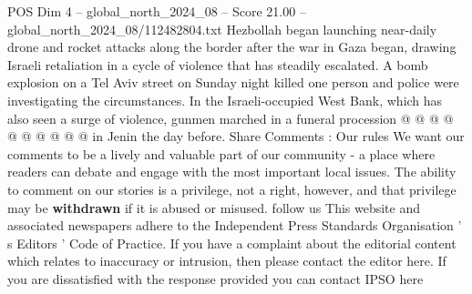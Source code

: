 \begin{textsample}{POS Dim 4 – global\_north\_2024\_08 – Score 21.00 – global\_north\_2024\_08/112482804.txt}
Hezbollah began launching near-daily drone and rocket attacks along the border after the war in Gaza began, drawing Israeli retaliation in a cycle of violence that has steadily escalated.
A bomb explosion on a Tel Aviv street on Sunday night killed one person and police were investigating the circumstances.
In the Israeli-occupied West Bank, which has also seen a surge of violence, gunmen marched in a funeral procession @ @ @ @ @ @ @ @ @ @ in Jenin the day before.
Share Comments : Our rules We want our comments to be a lively and valuable part of our community - a place where readers can debate and engage with the most important local issues.
The ability to comment on our stories is a privilege, not a right, however, and that privilege may be \textbf{withdrawn} if it is abused or misused. follow us This website and associated newspapers adhere to the Independent Press Standards Organisation ' s Editors ' Code of Practice.
If you have a complaint about the editorial content which relates to inaccuracy or intrusion, then please contact the editor here.
If you are dissatisfied with the response provided you can contact IPSO here

\end{textsample}
